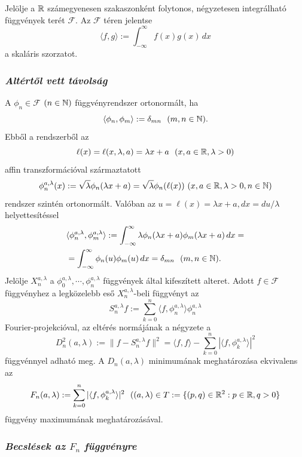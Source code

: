 \documentclass[oneside,titlepage,12pt,a4paper]{report}
\begin{document}
Jelölje a $\Bbb R$ számegyenesen szakaszonként folytonos, négyzetesen integrálható függvények terét $\mathcal F$. Az $\mathcal F$ téren jelentse
$$
\langle f,g\rangle:=\int_{-\infty}^\infty  f(x)g(x)\,dx
$$
a skaláris szorzatot.


\subsubsection{\it  Altértől vett távolság}

A  $\phi_n\in \mathcal F$ $(n\in\Bbb N)$ függvényrendszer  ortonormált, ha
$$
\langle \phi_n,\phi_m\rangle:=\delta_{mn}\ \ (m,n\in\Bbb N).
$$
Ebből a rendszerből az
$$
\ell(x)=\ell(x,\lambda, a)=\lambda x+a\ \ (x,a\in\Bbb R,\lambda>0)
$$
affin transzformációval származtatott
$$
\phi_n^{a,\lambda}(x):=\sqrt \lambda \phi_n(\lambda x+a)=\sqrt \lambda \phi_n(\ell(x)) \ (x,a\in\Bbb R,\lambda>0, n\in\Bbb N)
$$
rendszer szintén ortonormált. Valóban az $u=\ell(x)=\lambda x+a, dx=du/\lambda $ helyettesítéssel
\begin{equation}
\begin{split}
&\langle \phi_n^{a,\lambda},\phi_m^{a,\lambda}\rangle:=
\int_{-\infty}^\infty\lambda \phi_n(\lambda x+a)\phi_m(\lambda x+a)\, dx=\\
&=\int_{-\infty}^\infty \phi_n(u)\phi_m(u)\, dx=
\delta_{mn}\ \ (m,n\in\Bbb N).
\end{split}
\end{equation}
Jelölje  $X_n^{a,\lambda}$ a $\phi_0^{a,\lambda},\cdots,\phi_n^{a,\lambda}$ függvények által kifeszített alteret. Adott $f\in \mathcal F$ függvényhez a legközelebb eső $X_n^{a,\lambda}$-beli függvényt az
$$
S_n^{a,\lambda}f:=\sum_{k=0}^n \langle f,\phi_n^{a,\lambda}\rangle\phi_n^{a,\lambda}
$$
Fourier-projekcióval, az eltérés normájának a  négyzete  a
$$
D_n^2(a,\lambda):=\|f-S_n^{a,\lambda}f\|^2=\langle f,f\rangle-\sum_{k=0}^n |\langle f,\phi_k^{a,\lambda}\rangle|^2
$$
függvénnyel adható meg. A $D_n(a,\lambda)$ minimumának meghatározása ekvivalens az
$$
F_n(a,\lambda):=\sum_{k=0}^n |\langle f,\phi_k^{a,\lambda}\rangle|^2\ \
((a,\lambda)\in T:=\{(p,q)\in\Bbb R^2:p\in\Bbb R, q>0\}
$$
függvény maximumának meghatározásával.

\subsubsection{\it  Becslések az $F_n$ függvényre}
\end{document}
